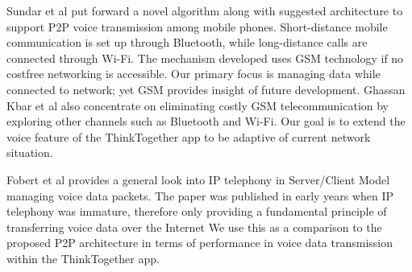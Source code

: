 Sundar et al \cite{SMPM_VoIP_ICAESM12} put forward a novel algorithm along with 
suggested architecture 
to support P2P voice transmission among mobile phones.  Short-distance mobile 
communication is set up through Bluetooth, while long-distance calls are 
connected through Wi-Fi. The mechanism developed uses GSM technology if no 
costfree networking is accessible. Our primary focus is managing data while 
connected to network; yet GSM provides insight of future development.  Ghassan 
Kbar et al \cite{GWA_P2P_VoIP_ICWMC10} also concentrate on eliminating costly 
GSM telecommunication by 
exploring other channels such as Bluetooth and Wi-Fi.  Our goal is to extend 
the 
voice feature of the ThinkTogether app to be adaptive of current network 
situation.
 
Fobert et al \cite{JSPS_USPatent05} provides a general look into IP telephony 
in Server/Client 
Model managing voice data packets.  The paper was published in early years when 
IP telephony was immature, therefore only providing a fundamental principle of 
transferring voice data over the Internet  We use this as a comparison to the 
proposed P2P architecture in terms of performance in voice data transmission 
within the ThinkTogether app.




